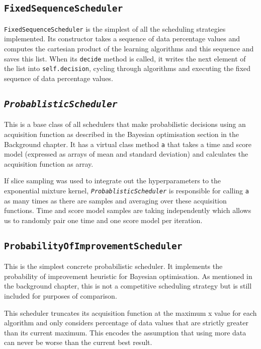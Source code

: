 \documentclass[a4paper,12pt,twoside,openright]{report}
\begin{document}

\subsection{\texttt{FixedSequenceScheduler}}
\texttt{FixedSequenceScheduler} is the simplest of all the scheduling strategies implemented. Its constructor takes a sequence of data percentage values and computes the cartesian product of the learning algorithms and this sequence and saves this list. When its \texttt{decide} method is called, it writes the next element of the list into \texttt{self.decision}, cycling through algorithms and executing the fixed sequence of data percentage values.


\subsection{\texttt{\textit{ProbablisticScheduler}}}
This is a base class of all schedulers that make probabilistic decisions using an acquisition function as described in the Bayesian optimisation section in the Background chapter. It has a virtual class method \texttt{a} that takes a time and score model (expressed as arrays of mean and standard deviation) and calculates the acquisition function as array.

If slice sampling was used to integrate out the hyperparameters to the exponential mixture kernel, \texttt{\textit{ProbablisticScheduler}} is responsible for calling \texttt{a} as many times as there are samples and averaging over these acquisition functions. Time and score model samples are taking independently which allows us to randomly pair one time and one score model per iteration.

\subsection{\texttt{ProbabilityOfImprovementScheduler}}
This is the simplest concrete probabilistic scheduler. It implements the probability of improvement heuristic for Bayesian optimisation. As mentioned in the background chapter, this is not a competitive scheduling strategy but is still included for purposes of comparison.

This scheduler truncates its acquisition function at the maximum x value for each algorithm and only considers percentage of data values that are strictly greater than its current maximum. This encodes the assumption that using more data can never be worse than the current best result.
\end{document}

